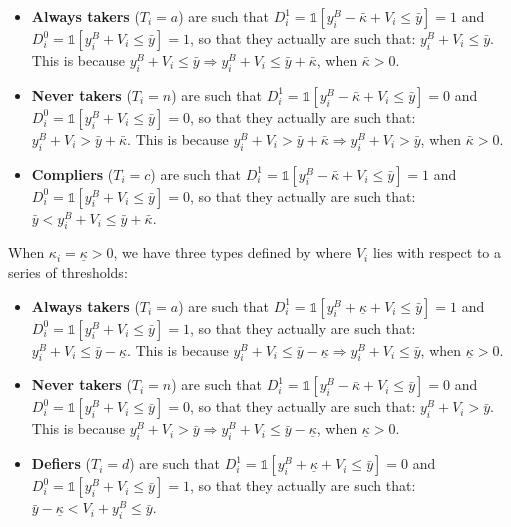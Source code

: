 \documentclass[
]{book}
\providecommand{\tightlist}{%
  \setlength{\itemsep}{0pt}\setlength{\parskip}{0pt}}
\newcommand{\uns}[1]{\mathds{1}[ #1 ]}
\theoremstyle{definition}
\theoremstyle{definition}
\theoremstyle{definition}
\theoremstyle{definition}
\theoremstyle{remark}
\begin{document}
\begin{itemize}
\tightlist
\item
  \textbf{Always takers} (\(T_i=a\)) are such that \(D^1_i=\uns{y_i^B-\bar{\kappa} + V_i\leq\bar{y}}=1\) and \(D^0_i=\uns{y_i^B + V_i\leq\bar{y}}=1\), so that they actually are such that: \(y_i^B+V_i\leq\bar{y}\).
  This is because \(y_i^B+V_i\leq\bar{y} \Rightarrow y_i^B+V_i\leq\bar{y}+\bar{\kappa}\), when \(\bar{\kappa}>0\).
\item
  \textbf{Never takers} (\(T_i=n\)) are such that \(D^1_i=\uns{y_i^B-\bar{\kappa} + V_i\leq\bar{y}}=0\) and \(D^0_i=\uns{y_i^B + V_i\leq\bar{y}}=0\), so that they actually are such that: \(y_i^B+V_i>\bar{y}+\bar{\kappa}\).
  This is because \(y_i^B+V_i>\bar{y}+\bar{\kappa} \Rightarrow y_i^B+V_i>\bar{y}\), when \(\bar{\kappa}>0\).
\item
  \textbf{Compliers} (\(T_i=c\)) are such that \(D^1_i=\uns{y_i^B-\bar{\kappa} + V_i\leq\bar{y}}=1\) and \(D^0_i=\uns{y_i^B + V_i\leq\bar{y}}=0\), so that they actually are such that: \(\bar{y}<y_i^B+V_i\leq\bar{y}+\bar{\kappa}\).
\end{itemize}

When \(\kappa_i=\underline{\kappa}>0\), we have three types defined by where \(V_i\) lies with respect to a series of thresholds:

\begin{itemize}
\tightlist
\item
  \textbf{Always takers} (\(T_i=a\)) are such that \(D^1_i=\uns{y_i^B+\underline{\kappa} + V_i\leq\bar{y}}=1\) and \(D^0_i=\uns{y_i^B + V_i\leq\bar{y}}=1\), so that they actually are such that: \(y_i^B+V_i\leq\bar{y}-\underline{\kappa}\).
  This is because \(y_i^B+V_i\leq\bar{y}-\underline{\kappa} \Rightarrow y_i^B+V_i\leq\bar{y}\), when \(\underline{\kappa}>0\).
\item
  \textbf{Never takers} (\(T_i=n\)) are such that \(D^1_i=\uns{y_i^B-\bar{\kappa} + V_i\leq\bar{y}}=0\) and \(D^0_i=\uns{y_i^B + V_i\leq\bar{y}}=0\), so that they actually are such that: \(y_i^B+V_i>\bar{y}\).
  This is because \(y_i^B+V_i>\bar{y} \Rightarrow y_i^B+V_i\leq\bar{y}-\underline{\kappa}\), when \(\underline{\kappa}>0\).
\item
  \textbf{Defiers} (\(T_i=d\)) are such that \(D^1_i=\uns{y_i^B+\underline{\kappa} + V_i\leq\bar{y}}=0\) and \(D^0_i=\uns{y_i^B + V_i\leq\bar{y}}=1\), so that they actually are such that: \(\bar{y}-\underline{\kappa}<V_i+y_i^B\leq\bar{y}\).
\end{itemize}
\end{document}
